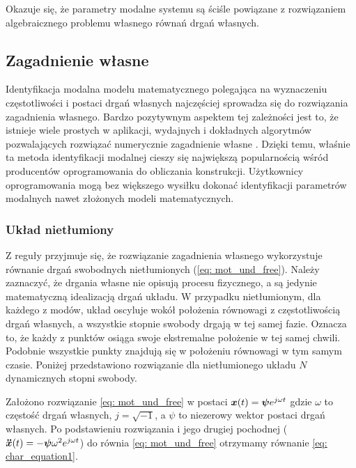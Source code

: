 Okazuje się, że parametry modalne systemu są ściśle powiązane z rozwiązaniem algebraicznego problemu własnego równań drgań własnych. 

\subsection{Zagadnienie własne}
Identyfikacja modalna modelu matematycznego polegająca na wyznaczeniu częstotliwości i postaci drgań własnych najczęściej sprowadza się do rozwiązania zagadnienia własnego. Bardzo pozytywnym aspektem tej zależności jest to, że istnieje wiele prostych w aplikacji, wydajnych i dokładnych algorytmów pozwalających rozwiązać numerycznie zagadnienie własne \parencite{Golub2013}. Dzięki temu, właśnie ta metoda identyfikacji modalnej cieszy się największą popularnością wśród producentów oprogramowania do obliczania konstrukcji. Użytkownicy oprogramowania mogą bez większego wysiłku dokonać identyfikacji parametrów modalnych nawet złożonych modeli matematycznych. 
\subsubsection{Układ nietłumiony}
Z reguły przyjmuje się, że rozwiązanie zagadnienia własnego wykorzystuje równanie drgań swobodnych nietłumionych (\ref{eq: mot_und_free}). Należy zaznaczyć, że drgania własne nie opisują procesu fizycznego, a są jedynie matematyczną idealizacją drgań układu. W przypadku nietłumionym, dla każdego z modów, układ oscyluje wokół położenia równowagi z częstotliwością drgań własnych, a wszystkie stopnie swobody drgają w tej samej fazie. Oznacza to, że każdy z punktów osiąga swoje ekstremalne położenie w tej samej chwili. Podobnie wszystkie punkty znajdują się w położeniu równowagi w tym samym czasie. Poniżej przedstawiono rozwiązanie dla nietłumionego układu $N$ dynamicznych stopni swobody.

Założono rozwiązanie \ref{eq: mot_und_free} w postaci $\bm{x}(t)=\bm{\psi}e^{j\omega t}$ gdzie $\omega$ to częstość drgań własnych, $j=\sqrt{-1}$, a $\psi$ to niezerowy wektor postaci drgań własnych. Po podstawieniu rozwiązania i jego drugiej pochodnej ($\bm{\ddot{x}}(t)=-\bm{\psi} \omega^2 e^{j\omega t}$) do równia \ref{eq: mot_und_free} otrzymamy równanie \ref{eq: char_equation1}.

